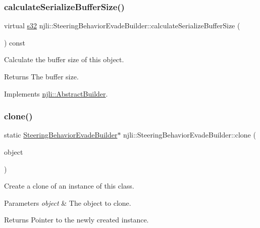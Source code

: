 \subsubsection{\texorpdfstring{calculate\+Serialize\+Buffer\+Size()}{calculateSerializeBufferSize()}}
{\footnotesize\ttfamily virtual \mbox{\hyperlink{_util_8h_aa62c75d314a0d1f37f79c4b73b2292e2}{s32}} njli\+::\+Steering\+Behavior\+Evade\+Builder\+::calculate\+Serialize\+Buffer\+Size (\begin{DoxyParamCaption}{ }\end{DoxyParamCaption}) const\hspace{0.3cm}{\ttfamily [virtual]}}

Calculate the buffer size of this object.

\begin{DoxyReturn}{Returns}
The buffer size. 
\end{DoxyReturn}


Implements \mbox{\hyperlink{classnjli_1_1_abstract_builder_aa1d220053e182c37b31b427499c6eacf}{njli\+::\+Abstract\+Builder}}.

\mbox{\label{classnjli_1_1_steering_behavior_evade_builder_ac0994fe63ce131aa9d295887e9098fce}} 
\subsubsection{\texorpdfstring{clone()}{clone()}}
{\footnotesize\ttfamily static \mbox{\hyperlink{classnjli_1_1_steering_behavior_evade_builder}{Steering\+Behavior\+Evade\+Builder}}$\ast$ njli\+::\+Steering\+Behavior\+Evade\+Builder\+::clone (\begin{DoxyParamCaption}\item[{const \mbox{\hyperlink{classnjli_1_1_steering_behavior_evade_builder}{Steering\+Behavior\+Evade\+Builder}} \&}]{object }\end{DoxyParamCaption})\hspace{0.3cm}{\ttfamily [static]}}

Create a clone of an instance of this class.


\begin{DoxyParams}{Parameters}
{\em object} & The object to clone.\\
\hline
\end{DoxyParams}
\begin{DoxyReturn}{Returns}
Pointer to the newly created instance. 
\end{DoxyReturn}
\mbox{\label{classnjli_1_1_steering_behavior_evade_builder_a95adf43ab644e79d5dcc53a5b2620981}} 
